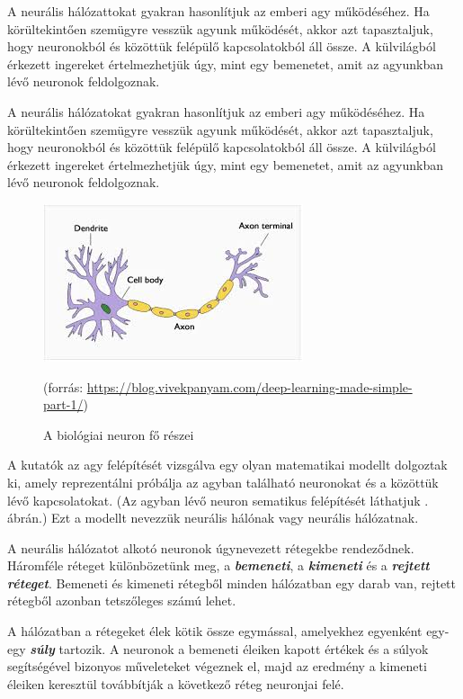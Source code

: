 
A neurális hálózattokat \cite{neuralis77} gyakran hasonlítjuk az emberi agy működéséhez. Ha körültekintően szemügyre vesszük agyunk működését, akkor azt tapasztaljuk, hogy neuronokból és közöttük felépülő kapcsolatokból áll össze. A külvilágból érkezett ingereket értelmezhetjük úgy, mint egy bemenetet, amit az agyunkban lévő neuronok feldolgoznak.

A neurális hálózatokat gyakran hasonlítjuk az emberi agy működéséhez. Ha körültekintően szemügyre vesszük agyunk működését, akkor azt tapasztaljuk, hogy neuronokból és közöttük felépülő kapcsolatokból áll össze. A külvilágból érkezett ingereket értelmezhetjük úgy, mint egy bemenetet, amit az agyunkban lévő neuronok feldolgoznak.

\begin{figure}[h]
	\centering
	\includegraphics[scale=1.0]{images/neuron.png}
	\caption{A biológiai neuron fő részei}
	\label{fig:neuron}
	(forrás: \url{https://blog.vivekpanyam.com/deep-learning-made-simple-part-1/})
\end{figure}

A kutatók az agy felépítését vizsgálva egy olyan matematikai modellt dolgoztak ki, amely   reprezentálni próbálja az agyban található neuronokat  és a közöttük lévő kapcsolatokat. (Az agyban lévő neuron sematikus felépítését láthatjuk . ábrán.) Ezt a modellt nevezzük neurális hálónak vagy neurális hálózatnak.

A neurális hálózatot alkotó neuronok úgynevezett rétegekbe rendeződnek. Háromféle réteget különbözetünk meg, a \textbf{\textit{bemeneti}}, a \textbf{\textit{kimeneti}} és a \textbf{\textit{rejtett réteget}}. Bemeneti és kimeneti rétegből minden hálózatban egy darab van, rejtett rétegből azonban tetszőleges számú lehet.

A hálózatban a rétegeket élek kötik össze egymással, amelyekhez egyenként egy-egy \textbf{\textit{súly}} tartozik. A neuronok a bemeneti éleiken kapott értékek és a súlyok segítségével bizonyos műveleteket végeznek el, majd az eredmény a kimeneti éleiken keresztül továbbítják a következő réteg neuronjai felé.

